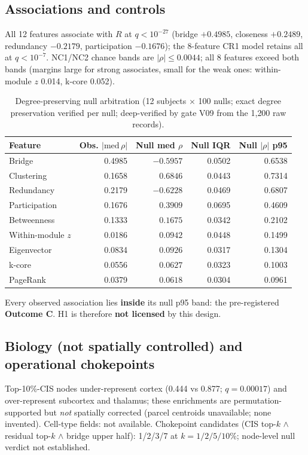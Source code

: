 \documentclass[11pt,a4paper]{article}
\begin{document}
\subsection{Associations and controls}
All 12 features associate with $R$ at $q<10^{-27}$ (bridge $+0.4985$,
closeness $+0.2489$, redundancy $-0.2179$, participation $-0.1676$); the
8-feature CR1 model retains all at $q<10^{-7}$. NC1/NC2 chance bands are
$|\rho|\le0.0044$; all 8 features exceed both bands (margins large for
strong associates, small for the weak ones: within-module $z$ 0.014,
k-core 0.052).

\begin{table}[ht]
\centering\small
\caption{Degree-preserving null arbitration (12 subjects $\times$ 100
nulls; exact degree preservation verified per null; deep-verified by gate
V09 from the 1{,}200 raw records).}
\begin{tabular}{lrrrr}
\toprule
Feature & Obs. $|\mathrm{med}\,\rho|$ & Null med $\rho$ & Null IQR & Null $|\rho|$ p95 \\
\midrule
Bridge & 0.4985 & $-0.5957$ & 0.0502 & 0.6538 \\
Clustering & 0.1658 & $0.6846$ & 0.0443 & 0.7314 \\
Redundancy & 0.2179 & $-0.6228$ & 0.0469 & 0.6807 \\
Participation & 0.1676 & $0.3909$ & 0.0695 & 0.4609 \\
Betweenness & 0.1333 & $0.1675$ & 0.0342 & 0.2102 \\
Within-module $z$ & 0.0186 & $0.0942$ & 0.0448 & 0.1499 \\
Eigenvector & 0.0834 & $0.0926$ & 0.0317 & 0.1304 \\
k-core & 0.0556 & $0.0627$ & 0.0323 & 0.1003 \\
PageRank & 0.0379 & $0.0618$ & 0.0304 & 0.0961 \\
\bottomrule
\end{tabular}
\end{table}

Every observed association lies \textbf{inside} its null p95 band: the
pre-registered \textbf{Outcome C}. H1 is therefore \textbf{not licensed} by
this design.

\subsection{Biology (not spatially controlled) and operational chokepoints}
Top-10\%-CIS nodes under-represent cortex (0.444 vs 0.877; $q=0.00017$)
and over-represent subcortex and thalamus; these enrichments are
permutation-supported but \emph{not} spatially corrected (parcel centroids
unavailable; none invented). Cell-type fields: not available. Chokepoint
candidates (CIS top-$k$ $\wedge$ residual top-$k$ $\wedge$ bridge upper
half): 1/2/3/7 at $k=1/2/5/10\%$; node-level null verdict not established.
\end{document}
